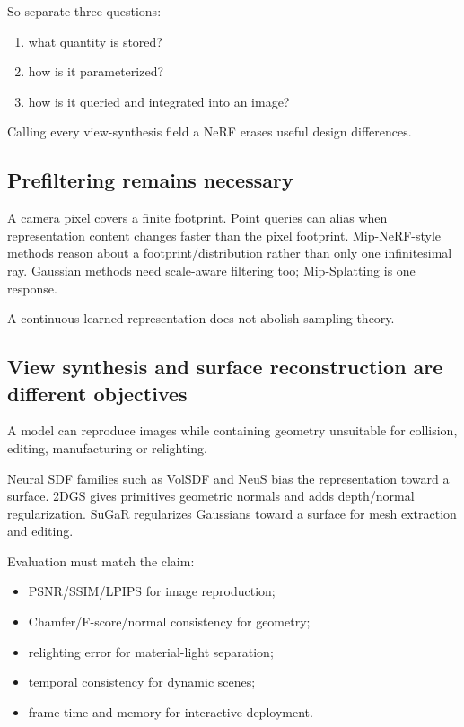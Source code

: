 So separate three questions:

\begin{enumerate}
\def\labelenumi{\arabic{enumi}.}
\tightlist
\item
  what quantity is stored?
\item
  how is it parameterized?
\item
  how is it queried and integrated into an image?
\end{enumerate}

Calling every view-synthesis field a NeRF erases useful design differences.

\subsection{Prefiltering remains necessary}\label{prefiltering-remains-necessary}

A camera pixel covers a finite footprint. Point queries can alias when representation content changes faster than the pixel footprint. Mip-NeRF-style methods reason about a footprint/distribution rather than only one infinitesimal ray. Gaussian methods need scale-aware filtering too; Mip-Splatting is one response.

A continuous learned representation does not abolish sampling theory.

\subsection{View synthesis and surface reconstruction are different objectives}\label{view-synthesis-and-surface-reconstruction-are-different-objectives}

A model can reproduce images while containing geometry unsuitable for collision, editing, manufacturing or relighting.

Neural SDF families such as VolSDF and NeuS bias the representation toward a surface. 2DGS gives primitives geometric normals and adds depth/normal regularization. SuGaR regularizes Gaussians toward a surface for mesh extraction and editing.

Evaluation must match the claim:

\begin{itemize}
\tightlist
\item
  PSNR/SSIM/LPIPS for image reproduction;
\item
  Chamfer/F-score/normal consistency for geometry;
\item
  relighting error for material-light separation;
\item
  temporal consistency for dynamic scenes;
\item
  frame time and memory for interactive deployment.
\end{itemize}


